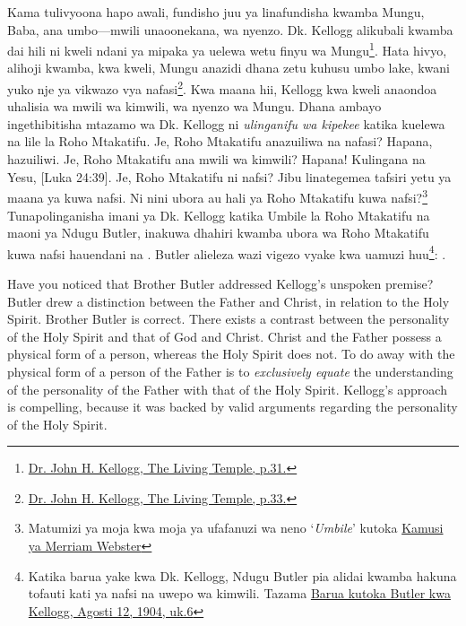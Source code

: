 Kama tulivyoona hapo awali, fundisho juu ya  linafundisha kwamba Mungu, Baba, ana umbo—mwili unaoonekana, wa nyenzo. Dk. Kellogg alikubali kwamba dai hili ni kweli ndani ya mipaka ya uelewa wetu finyu wa Mungu\footnote{\href{https://archive.org/details/J.H.Kellogg.TheLivingTemple1903/page/n33/}{Dr. John H. Kellogg, The Living Temple, p.31.}}. Hata hivyo, alihoji kwamba, kwa kweli, Mungu anazidi dhana zetu kuhusu umbo lake, kwani yuko nje ya vikwazo vya nafasi\footnote{\href{https://archive.org/details/J.H.Kellogg.TheLivingTemple1903/page/n33/}{Dr. John H. Kellogg, The Living Temple, p.33.}}. Kwa maana hii, Kellogg kwa kweli anaondoa uhalisia wa mwili wa kimwili, wa nyenzo wa Mungu. Dhana ambayo ingethibitisha mtazamo wa Dk. Kellogg ni \textit{ulinganifu wa kipekee} katika kuelewa  na lile la Roho Mtakatifu. Je, Roho Mtakatifu anazuiliwa na nafasi? Hapana, hazuiliwi. Je, Roho Mtakatifu ana mwili wa kimwili? Hapana! Kulingana na Yesu, [Luka 24:39]. Je, Roho Mtakatifu ni nafsi? Jibu linategemea tafsiri yetu ya maana ya kuwa nafsi. Ni nini ubora au hali ya Roho Mtakatifu kuwa nafsi?\footnote{Matumizi ya moja kwa moja ya ufafanuzi wa neno ‘\textit{Umbile}’ kutoka \href{https://www.merriam-webster.com/dictionary/personality}{Kamusi ya Merriam Webster}} Tunapolinganisha imani ya Dk. Kellogg katika Umbile la Roho Mtakatifu na maoni ya Ndugu Butler, inakuwa dhahiri kwamba ubora wa Roho Mtakatifu kuwa nafsi hauendani na . Butler alieleza wazi vigezo vyake kwa uamuzi huu\footnote{Katika barua yake kwa Dk. Kellogg, Ndugu Butler pia alidai kwamba hakuna tofauti kati ya nafsi na uwepo wa kimwili. Tazama \href{https://c7da.us/egwdl/Butler\%20to\%20Kellogg\%20Aug121904.pdf}{Barua kutoka Butler kwa Kellogg, Agosti 12, 1904, uk.6}}: .


Have you noticed that Brother Butler addressed Kellogg’s unspoken premise? Butler drew a distinction between the Father and Christ, in relation to the Holy Spirit. Brother Butler is correct. There exists a contrast between the personality of the Holy Spirit and that of God and Christ. Christ and the Father possess a physical form of a person, whereas the Holy Spirit does not. To do away with the physical form of a person of the Father is to \textit{exclusively equate} the understanding of the personality of the Father with that of the Holy Spirit. Kellogg’s approach is compelling, because it was backed by valid arguments regarding the personality of the Holy Spirit.


